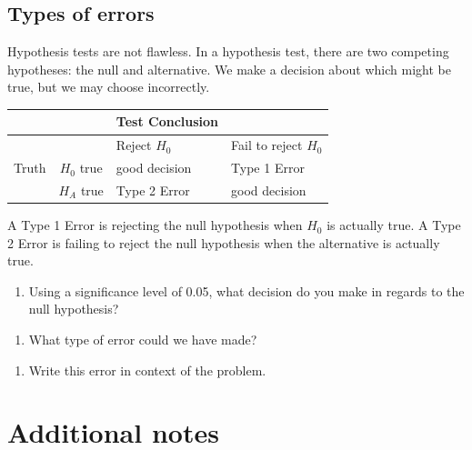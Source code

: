 \documentclass[
]{report}
\providecommand{\tightlist}{%
  \setlength{\itemsep}{0pt}\setlength{\parskip}{0pt}}
\begin{document}
\vspace{.5in}

\hypertarget{types-of-errors}{%
\subsection{Types of errors}\label{types-of-errors}}

Hypothesis tests are not flawless. In a hypothesis test, there are two competing hypotheses: the null and alternative. We make a decision about which might be true, but we may choose incorrectly.

\begin{longtable}[]{@{}ccll@{}}
\toprule
& & Test Conclusion &\tabularnewline
\midrule
\endhead
& & Reject \(H_0\) & Fail to reject \(H_0\)\tabularnewline
Truth & \(H_0\) true & good decision & Type 1 Error\tabularnewline
& \(H_A\) true & Type 2 Error & good decision\tabularnewline
\bottomrule
\end{longtable}

A Type 1 Error is rejecting the null hypothesis when \(H_0\) is actually true. A Type 2 Error is failing to reject the null hypothesis when the alternative is actually true.

\begin{enumerate}
\def\labelenumi{\arabic{enumi}.}
\setcounter{enumi}{25}
\tightlist
\item
  Using a significance level of 0.05, what decision do you make in regards to the null hypothesis?
\end{enumerate}

\vspace{0.5in}

\begin{enumerate}
\def\labelenumi{\arabic{enumi}.}
\setcounter{enumi}{26}
\tightlist
\item
  What type of error could we have made?
\end{enumerate}

\vspace{0.5in}

\begin{enumerate}
\def\labelenumi{\arabic{enumi}.}
\setcounter{enumi}{27}
\tightlist
\item
  Write this error in context of the problem.
\end{enumerate}

\vspace{1in}

\hypertarget{additional-notes}{%
\section{Additional notes}\label{additional-notes}}
\end{document}
